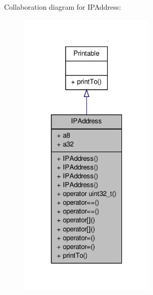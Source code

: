 Collaboration diagram for I\-P\-Address\-:
\nopagebreak
\begin{figure}[H]
\begin{center}
\leavevmode
\includegraphics[width=184pt]{class_i_p_address__coll__graph}
\end{center}
\end{figure}
